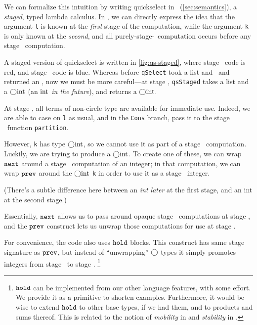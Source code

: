 We can formalize this intuition by writing quickselect in \lang\
(\ref{sec:semantics}), a \emph{staged}, typed lambda calculus. In \lang, we can
directly express the idea that the argument \texttt{l} is known at the
\emph{first} stage of the computation, while the argument \texttt{k} is only
known at the \emph{second}, and all purely-stage-\bbone\ computation occurs
before any stage \bbtwo\ computation.

A staged version of quickselect is written in \ref{fig:qs-staged}, where stage
\bbone\ code is red, and stage \bbtwo\ code is blue. Whereas before
\texttt{qSelect} took a \textrm{list} and \rmint\ and returned an \rmint, now we
must be more careful---at stage \bbone, \texttt{qsStaged} takes a \textrm{list}
and a $\bigcirc{\rm int}$ (an ${\rm int}$ \emph{in the future}), and returns a
$\bigcirc{\rm int}$. 

At stage \bbone, all terms of non-circle type are available for
immediate use. Indeed, we are able to case on \texttt{l} as usual, and in the
\texttt{Cons} branch, pass it to the stage \bbone\ function \texttt{partition}.


However, \texttt{k} has type $\bigcirc{\rm int}$, so we cannot use it as part of a
stage \bbone\ computation. Luckily, we are trying to produce a $\bigcirc{\rm int}$. To
create one of these, we can wrap ${\tt next}$ around a stage \bbtwo\ computation of
an integer; in that computation, we can wrap ${\tt prev}$ around the $\bigcirc{\rm int}$
\texttt{k} in order to use it as a stage \bbtwo\ integer.

(There's a subtle difference here between an \emph{int later} at the first
stage, and an int at the second stage.)

Essentially, ${\tt next}$ allows us to pass around opaque stage \bbtwo\ computations
at stage \bbone, and the ${\tt prev}$ construct lets us unwrap those computations for
use at stage \bbtwo.

For convenience, the code also uses ${\tt hold}$ blocks. This construct has same
stage signature as ${\tt prev}$, but instead of ``unwrapping'' $\bigcirc$ types it simply
promotes integers from stage \bbone\ to stage \bbtwo.%
\footnote{${\tt hold}$ can be implemented from our other language features, with
some effort. We provide it as a primitive to shorten examples. Furthermore, it
would be wise to extend ${\tt hold}$ to other base types, if we had them, and to
products and sums thereof.  This is related to the notion of {\em mobility} in
\cite{murphy05} and {\em stability} in \cite{krishnaswami13}.}

